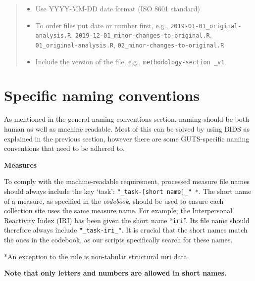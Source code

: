 \documentclass[
  letterpaper,
  DIV=11,
  numbers=noendperiod]{scrreprt}
\begin{document}
\begin{itemize}
  \label{naming-conventions-3}
  \begin{quote}
  \begin{itemize}
  \item
    Use YYYY-MM-DD date format (ISO 8601 standard)
  \item
    To order files put date or number first, e.g.,
    \texttt{2019-01-01\_original-analysis.R},
    \texttt{2019-12-01\_minor-changes-to-original.R},
    \texttt{01\_original-analysis.R},
    \texttt{02\_minor-changes-to-original.R}
  \item
    Include the version of the file, e.g.,
    \texttt{methodology-section\ \_v1}
  \end{itemize}
  \end{quote}
\end{itemize}

\chapter{Specific naming conventions}\label{specific-naming-conventions}

As mentioned in the general naming conventions section, naming should be
both human as well as machine readable. Most of this can be solved by
using BIDS as explained in the previous section, however there are some
GUTS-specific naming conventions that need to be adhered to.

\begin{tcolorbox}[enhanced jigsaw, arc=.35mm, left=2mm, breakable, colframe=quarto-callout-tip-color-frame, colback=white, opacityback=0, rightrule=.15mm, toprule=.15mm, bottomrule=.15mm, leftrule=.75mm]

\vspace{-3mm}\textbf{Measures}\vspace{3mm}

To comply with the machine-readable requirement, processed measure file
names should always include the key `task':
\texttt{"\_task-{[}short\ name{]}\_"\ *}. The short name of a measure,
as specified in the \emph{codebook}, should be used to ensure each
collection site uses the same measure name. For example, the
Interpersonal Reactivity Index (IRI) has been given the short name
``\texttt{iri}''. Its file name should therefore always include
\texttt{"\_task-iri\_"}. It is crucial that the short names match the
ones in the codebook, as our scripts specifically search for these
names.

*An exception to the rule is non-tabular structural mri data.

\textbf{Note that only letters and numbers are allowed in short names.}

\end{tcolorbox}
\end{document}
